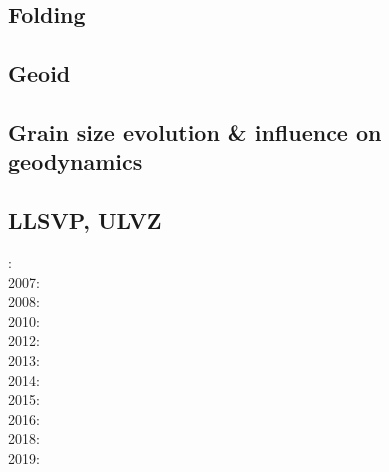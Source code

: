 \subsection*{Folding}

\noindent
\cite{ramb68}
\cite{ramb70}
\cite{ramb71}
\cite{flet91}
\cite{flet95}
\cite{frsc06}
\cite{schm08}
\cite{resb10}
\cite{freh11}
\cite{reds12}\cite{grsc12}
\cite{regc13}
\cite{freh14}\cite{frex14}
\cite{frsc16}


\subsection*{Geoid}

\cite{davi84}\cite{hage84}
\cite{davi86}
\cite{zhgu92}\cite{kiha92}
\cite{zhch93}\cite{rirl93}
\cite{king95}
\cite{mogu96}
\cite{cava98}
\cite{king09}
\cite{hibi12}
\cite{grab17}
\cite{king18}

\subsection*{Grain size evolution \& influence on geodynamics}

\cite{brcp99}
\cite{soet02}
\cite{hapa03}
\cite{rorb11}
\cite{besr14}
\cite{thrk15}\cite{tukb15}
\cite{ceww17}\cite{daef17}\cite{mube17}
\cite{bemu18}\cite{bezb18}\cite{mube18}


\subsection*{LLSVP, ULVZ}

: \cite{dagu86}\\
2007: \cite{heta07}\\
2008: \cite{gamc08}\\
2010: \cite{stto10}\\
2012: \cite{stto12}\cite{dagd12}\cite{dect12}\\
2013: \cite{limc13}\cite{bogs13a}\\
2014: \cite{budt14}\cite{lidt14}\\
2015: \cite{musd15}\cite{hafg15}\cite{mczh05a}\\
2016: \cite{dost16}\\
2018: \cite{daga18}\\
2019: \cite{hebo19}

